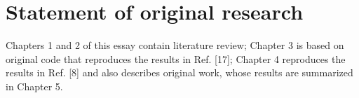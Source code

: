 \section*{Statement of original research}

Chapters 1 and 2 of this essay contain literature review; Chapter 3 is based on original code that reproduces the results in Ref. [17]; Chapter 4 reproduces the results in Ref. [8] and also describes original work, whose results are summarized in Chapter 5. 